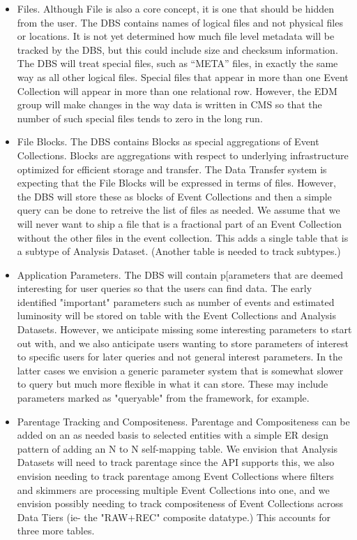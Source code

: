 \documentclass{cmspaper}
\begin{document}
\begin{itemize}
\item Files.  Although File is also a core concept, it is one that should be hidden 
from the user.  The DBS contains names of logical files and not physical files or 
locations.  It is not yet
determined how much file level metadata will be tracked by the DBS, but this could include 
size and checksum information.
The DBS will treat special files, such as ``META'' files, in 
exactly the same way as all other logical files.  Special files that 
appear in more than one Event Collection will appear in more than one
relational row.  However, the EDM group will 
make changes in the way data is written in CMS so that the number of 
such special files tends to zero in the long run.  
\item File Blocks.  The DBS contains Blocks as special aggregations of Event 
Collections. Blocks are aggregations with respect to underlying 
infrastructure optimized for efficient storage and transfer.  The Data
Transfer system is expecting that the File Blocks will be expressed in terms
of files.  However, the DBS will store these as blocks of Event Collections and then 
a simple query can be done to retreive the list of files as needed.  We assume that
we will never want to ship a file that is a fractional part of an Event Collection
without the other files in the event collection.  This adds a single table that is a 
subtype of Analysis Dataset.  (Another table is needed to track subtypes.) 
\item Application Parameters.  The DBS will contain p[arameters that are deemed interesting
for user queries so that the users can find data.  The early identified "important" parameters
such as number of events and estimated luminosity will be stored on table with the Event 
Collections and Analysis Datasets.  However, we anticipate missing some interesting parameters
to start out with, and we also anticipate users wanting to store parameters of interest to 
specific users for later queries and not general interest parameters.  In the latter cases we 
envision a generic parameter system that is somewhat slower to query but much more flexible in 
what it can store.  These may include parameters marked as "queryable" 
from the framework, for example.  
\item Parentage Tracking and Compositeness.  Parentage and Compositeness can be added on an
as needed basis to selected entities with a simple ER 
design pattern of adding an N to N self-mapping table.  We envision that Analysis Datasets
will need to track parentage since the API supports this, we also envision needing to track 
parentage among Event Collections where filters and skimmers are processing multiple Event 
Collections into one, and we envision possibly needing to track compositeness of Event Collections
across Data Tiers (ie- the "RAW+REC" composite datatype.)   This accounts for three more tables.  
\end{itemize}
\end{document}
